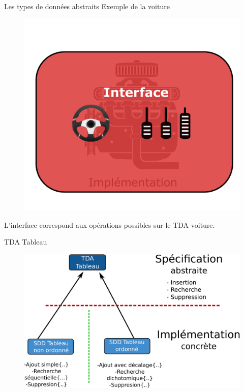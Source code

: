 \documentclass[12pt,a4paper,handout]{beamer}
\begin{document}
\begin{frame}{Les types de données abstraits}
{Exemple de la voiture}

\begin{figure}
\includegraphics[scale=0.4]{figs/car2} 
\end{figure}
\vspace{-2em}
L'interface correspond aux opérations possibles sur le TDA voiture.
\end{frame}


\begin{frame}{TDA Tableau}
\begin{figure}
\centering
\includegraphics[scale=0.4]{figs/ADTtableau} 
\end{figure}
\end{frame}
\end{document}
